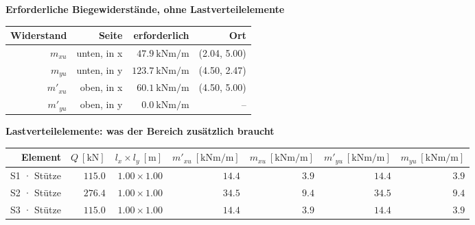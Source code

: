 \documentclass[11pt,a4paper]{article}
\begin{document}
\noindent\textbf{Erforderliche Biegewiderstände, ohne Lastverteilelemente}
\begin{longtable}{rrrr}
\hline
Widerstand & Seite & erforderlich & Ort \\
\hline
\endhead
$m_{xu}$ & unten, in x & $47.9\ \mathrm{kNm/m}$ & (2.04, 5.00) \\
$m_{yu}$ & unten, in y & $123.7\ \mathrm{kNm/m}$ & (4.50, 2.47) \\
$m'_{xu}$ & oben, in x & $60.1\ \mathrm{kNm/m}$ & (4.50, 5.00) \\
$m'_{yu}$ & oben, in y & $0.0\ \mathrm{kNm/m}$ & – \\
\hline
\end{longtable}
\noindent\textbf{Lastverteilelemente: was der Bereich zusätzlich braucht}
\begin{longtable}{rrrrrrr}
\hline
Element & $Q\ [\mathrm{kN}]$ & $l_x \times l_y\ [\mathrm{m}]$ & $m'_{xu}\ [\mathrm{kNm/m}]$ & $m_{xu}\ [\mathrm{kNm/m}]$ & $m'_{yu}\ [\mathrm{kNm/m}]$ & $m_{yu}\ [\mathrm{kNm/m}]$ \\
\hline
\endhead
S1 · Stütze & $115.0$ & $1.00 \times 1.00$ & $14.4$ & $3.9$ & $14.4$ & $3.9$ \\
S2 · Stütze & $276.4$ & $1.00 \times 1.00$ & $34.5$ & $9.4$ & $34.5$ & $9.4$ \\
S3 · Stütze & $115.0$ & $1.00 \times 1.00$ & $14.4$ & $3.9$ & $14.4$ & $3.9$ \\
\hline
\end{longtable}
\end{document}

